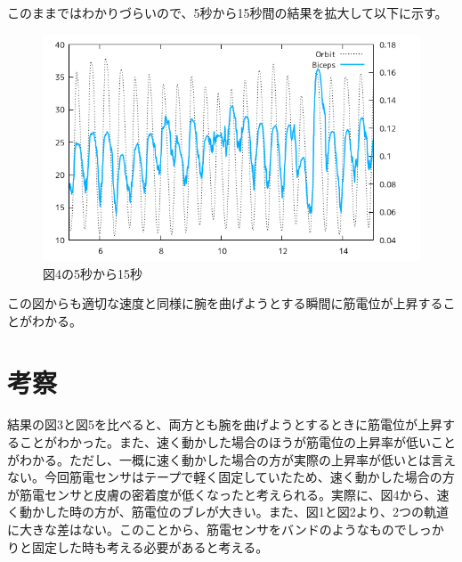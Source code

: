 \documentclass{jsarticle}
\begin{document}
このままではわかりづらいので、5秒から15秒間の結果を拡大して以下に示す。
\begin{figure}[t]
  \begin{center}
    \includegraphics[clip,width=150mm]{Graph_6.png}
    \caption{図4の5秒から15秒}
  \end{center}
\end{figure}
この図からも適切な速度と同様に腕を曲げようとする瞬間に筋電位が上昇することがわかる。

\section{考察}
結果の図3と図5を比べると、両方とも腕を曲げようとするときに筋電位が上昇することがわかった。また、速く動かした場合のほうが筋電位の上昇率が低いことがわかる。ただし、一概に速く動かした場合の方が実際の上昇率が低いとは言えない。今回筋電センサはテープで軽く固定していたため、速く動かした場合の方が筋電センサと皮膚の密着度が低くなったと考えられる。実際に、図4から、速く動かした時の方が、筋電位のブレが大きい。また、図1と図2より、2つの軌道に大きな差はない。このことから、筋電センサをバンドのようなものでしっかりと固定した時も考える必要があると考える。
\end{document}
